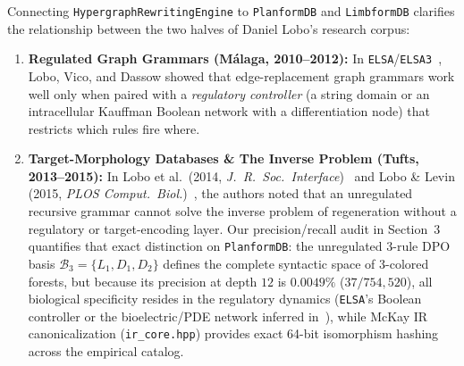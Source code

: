 \documentclass[11pt,a4paper]{article}
\theoremstyle{definition}
\theoremstyle{remark}
\begin{document}
Connecting \texttt{HypergraphRewritingEngine} to \texttt{PlanformDB} and \texttt{LimbformDB} clarifies the relationship between the two halves of Daniel Lobo's research corpus:
\begin{enumerate}
  \item \textbf{Regulated Graph Grammars (M\'alaga, 2010--2012):} In \texttt{ELSA}/\texttt{ELSA3}~\cite{Lobo2010Biosystems,Lobo2011TCS,Lobo2012BookChapter}, Lobo, Vico, and Dassow showed that edge-replacement graph grammars work well only when paired with a \emph{regulatory controller} (a string domain or an intracellular Kauffman Boolean network with a differentiation node) that restricts which rules fire where.
  \item \textbf{Target-Morphology Databases \& The Inverse Problem (Tufts, 2013--2015):} In Lobo et al.\ (2014, \emph{J.\ R.\ Soc.\ Interface})~\cite{Lobo2014LinearEncoding} and Lobo \& Levin (2015, \emph{PLOS Comput.\ Biol.})~\cite{Lobo2015PLOSCompBiol}, the authors noted that an unregulated recursive grammar cannot solve the inverse problem of regeneration without a regulatory or target-encoding layer. Our precision/recall audit in Section~3 quantifies that exact distinction on \texttt{PlanformDB}: the unregulated 3-rule DPO basis $\mathcal{B}_3 = \{L_1, D_1, D_2\}$ defines the complete syntactic space of 3-colored forests, but because its precision at depth $12$ is $0.0049\%$ ($37/754{,}520$), all biological specificity resides in the regulatory dynamics (\texttt{ELSA}'s Boolean controller or the bioelectric/PDE network inferred in~\cite{Lobo2015PLOSCompBiol,Cervera2021}), while McKay IR canonicalization (\texttt{ir\_core.hpp}) provides exact 64-bit isomorphism hashing across the empirical catalog.
\end{enumerate}
\end{document}
